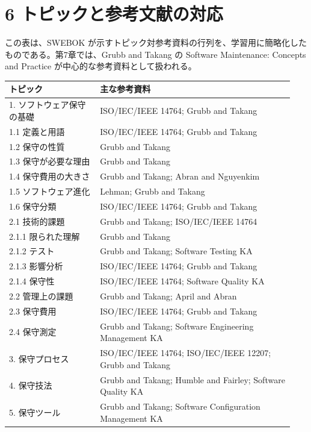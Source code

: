 \documentclass[a4paper,11pt]{ltjsarticle}
\begin{document}
\section{6 トピックと参考文献の対応}
この表は、SWEBOK が示すトピック対参考資料の行列を、学習用に簡略化したものである。第7章では、Grubb and Takang の Software Maintenance: Concepts and Practice が中心的な参考資料として扱われる。\par
\begin{longtable}{p{0.30\linewidth}p{0.64\linewidth}}
\toprule
トピック & 主な参考資料 \\
\midrule
\endhead
1. ソフトウェア保守の基礎 & ISO/IEC/IEEE 14764; Grubb and Takang \\
1.1 定義と用語 & ISO/IEC/IEEE 14764; Grubb and Takang \\
1.2 保守の性質 & Grubb and Takang \\
1.3 保守が必要な理由 & Grubb and Takang \\
1.4 保守費用の大きさ & Grubb and Takang; Abran and Nguyenkim \\
1.5 ソフトウェア進化 & Lehman; Grubb and Takang \\
1.6 保守分類 & ISO/IEC/IEEE 14764; Grubb and Takang \\
2.1 技術的課題 & Grubb and Takang; ISO/IEC/IEEE 14764 \\
2.1.1 限られた理解 & Grubb and Takang \\
2.1.2 テスト & Grubb and Takang; Software Testing KA \\
2.1.3 影響分析 & ISO/IEC/IEEE 14764; Grubb and Takang \\
2.1.4 保守性 & ISO/IEC/IEEE 14764; Software Quality KA \\
2.2 管理上の課題 & Grubb and Takang; April and Abran \\
2.3 保守費用 & ISO/IEC/IEEE 14764; Grubb and Takang \\
2.4 保守測定 & Grubb and Takang; Software Engineering Management KA \\
3. 保守プロセス & ISO/IEC/IEEE 14764; ISO/IEC/IEEE 12207; Grubb and Takang \\
4. 保守技法 & Grubb and Takang; Humble and Fairley; Software Quality KA \\
5. 保守ツール & Grubb and Takang; Software Configuration Management KA \\
\bottomrule
\end{longtable}
\end{document}

